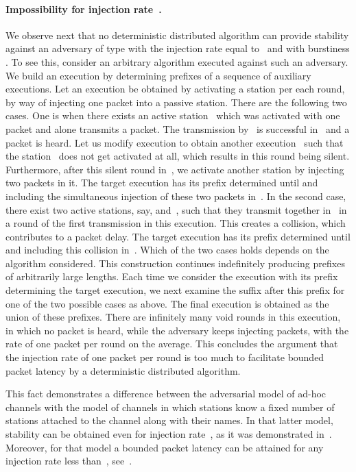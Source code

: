 \documentclass[11pt]{article}
\newcommand{\BBB}{\vspace*{-\bigskipamount}}
\newcommand{\Paragraph}[1]{\BBB\paragraph{#1}}
\begin{document}
\Paragraph{Impossibility for injection rate~.}


We observe next that no deterministic distributed algorithm can provide stability against an adversary of type  with the injection rate equal to~ and with burstiness .
To see this, consider an arbitrary algorithm executed against such an adversary.
We build an execution by determining prefixes of a sequence of auxiliary executions.
Let an execution  be obtained by activating a station per each round, by way of injecting one packet into a passive station.
There are the following two cases.
One is when there exists an active station~ which was activated with one packet and alone transmits a packet.
The transmission by~ is successful in~ and a packet is heard.
Let us modify execution  to obtain another execution~ such that the station~ does not get activated at all, which results in this round being silent.
Furthermore, after this silent round in~, we activate another station  by injecting two packets in it.
The target execution has its prefix determined until and including the simultaneous injection of these two packets in~.
In the second case, there exist two active stations, say,  and~, such that they transmit together in~ in a round of the first transmission in this execution.
This creates a collision, which contributes to a packet delay.
The target execution has its prefix determined until and including this collision in~.
Which of the two cases holds depends on the algorithm considered.
This construction continues indefinitely producing prefixes of arbitrarily large lengths.
Each time we consider the execution with its prefix determining the target execution, we next examine the suffix after this prefix for one of the two possible cases as above.
The final execution is obtained as the union of these prefixes.
There are infinitely many void rounds in this execution, in which no packet is heard, while the adversary keeps injecting packets, with the rate of one packet per round on the average.
This concludes the argument that the injection rate of one packet per round is too much to facilitate  bounded packet latency by a deterministic distributed algorithm.

This fact  demonstrates a difference between the adversarial model of ad-hoc channels with the model of channels in which  stations know a fixed number of stations attached to the channel along with their names.
In that latter model,  stability can be obtained even for  injection rate~, as it was demonstrated in~\cite{ChlebusKR09}.
Moreover, for that model a bounded packet latency can be attained for any injection rate less than~, see~\cite{AnantharamuCKR-INFOCOM10,AnantharamuCKR-SIROCCO11}.
\end{document}
